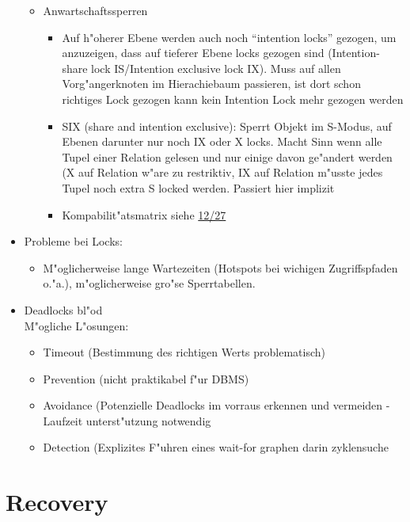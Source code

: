 \documentclass[a4paper, 12pt]{scrartcl}
\begin{document}
\begin{itemize}
\begin{itemize}
			\item
				Anwartschaftssperren
				\begin{itemize}
					\item
						Auf h"oherer Ebene werden auch noch \enquote{intention locks} gezogen, um anzuzeigen, dass auf tieferer Ebene locks gezogen sind (Intention-share lock IS/Intention exclusive lock IX). Muss auf allen Vorg"angerknoten im Hierachiebaum passieren, ist dort schon richtiges Lock gezogen kann kein Intention Lock mehr gezogen werden
					\item
						SIX (share and intention exclusive): Sperrt Objekt im S-Modus, auf Ebenen darunter nur noch IX oder X locks. Macht Sinn wenn alle Tupel einer Relation gelesen und nur einige davon ge"andert werden (X auf Relation w"are zu restriktiv, IX auf Relation m"usste jedes Tupel noch extra S locked werden. Passiert hier implizit
					\item
						Kompabilit"atsmatrix siehe \href{site:IDB-2015Ws-12-Synchronisation.pdf}{12/27}
				\end{itemize}
		\end{itemize}
	\item
		Probleme bei Locks:
		\begin{itemize}
			\item
				M"oglicherweise lange Wartezeiten (Hotspots bei wichigen Zugriffspfaden o."a.), m"oglicherweise gro"se Sperrtabellen. 
		\end{itemize}
	\item
		Deadlocks bl"od\\
		M"ogliche L"osungen:
		\begin{itemize}
			\item
				Timeout (Bestimmung des richtigen Werts problematisch)
			\item  Prevention (nicht praktikabel f"ur DBMS)
			\item  Avoidance (Potenzielle Deadlocks im vorraus erkennen und vermeiden - Laufzeit unterst"utzung notwendig
			\item  Detection (Explizites F"uhren eines wait-for graphen
				darin zyklensuche
		\end{itemize}
\end{itemize}


\section{Recovery}
\end{document}
